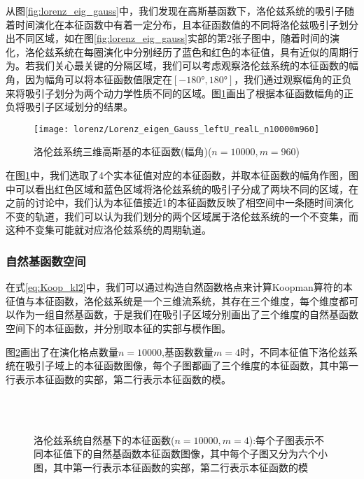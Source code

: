 从图\ref{fig:lorenz_eig_gauss}中，我们发现在高斯基函数下，洛伦兹系统的吸引子随着时间演化在本征函数中有着一定分布，且本征函数值的不同将洛伦兹吸引子划分出不同区域，如在图\ref{fig:lorenz_eig_gauss}实部的第2张子图中，随着时间的演化，洛伦兹系统在每圈演化中分别经历了蓝色和红色的本征值，具有近似的周期行为。若我们关心最关键的分隔区域，我们可以考虑观察洛伦兹系统的本征函数的幅角，因为幅角可以将本征函数值限定在$[-180°,180°]$，我们通过观察幅角的正负来将吸引子划分为两个动力学性质不同的区域。图\ref{fig:lorenz_eig_gauss_angle}画出了根据本征函数幅角的正负将吸引子区域划分的结果。

\begin{figure}
	\centering
	\texttt{[image: lorenz/Lorenz\_eigen\_Gauss\_leftU\_realL\_n10000m960]}
    \caption{洛伦兹系统三维高斯基的本征函数(幅角)($n=10000,m=960$)}\label{fig:lorenz_eig_gauss_angle}
\end{figure}

在图\ref{fig:lorenz_eig_gauss_angle}中，我们选取了4个实本征值对应的本征函数，并取本征函数的幅角作图，图中可以看出红色区域和蓝色区域将洛伦兹系统的吸引子分成了两块不同的区域，在之前的讨论中，我们认为本征值接近1的本征函数反映了相空间中一条随时间演化不变的轨道，我们可以认为我们划分的两个区域属于洛伦兹系统的一个不变集\cite{brunton2016koopman}，而这种不变集可能就对应洛伦兹系统的周期轨道。

\subsubsection{自然基函数空间}
在式\eqref{eq:Koop_kl2}中，我们可以通过构造自然函数格点来计算Koopman算符的本征值与本征函数，洛伦兹系统是一个三维流系统，其存在三个维度，每个维度都可以作为一组自然基函数，于是我们在吸引子区域分别画出了三个维度的自然基函数空间下的本征函数，并分别取本征的实部与模作图。

图\ref{fig:lorenz_eig_natural}画出了在演化格点数量$n=10000$,基函数数量$m=4$时，不同本征值下洛伦兹系统在吸引子域上的本征函数图像，每个子图都画了三个维度的本征函数，其中第一行表示本征函数的实部，第二行表示本征函数的模。
\begin{figure}
    \centering
    \\
    \\
    \caption{洛伦兹系统自然基下的本征函数($n=10000,m=4$):每个子图表示不同本征值下的自然基函数本征函数图像，其中每个子图又分为六个小图，其中第一行表示本征函数的实部，第二行表示本征函数的模}\label{fig:lorenz_eig_natural}
\end{figure}

